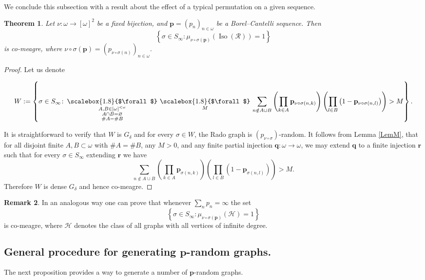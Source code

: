 \documentclass{amsart}
\newtheorem{theorem}{Theorem}[section]
\theoremstyle{plain}
\theoremstyle{definition}
\newtheorem{rem}[theorem]{Remark}
\theoremstyle{remark}
\numberwithin{equation}{section}
\DeclareMathOperator{\iso}{Iso}
\newcommand{\RR}{\mathcal{R}}
\begin{document}
We conclude this subsection with a result about the effect of a typical permutation on a given sequence.

\begin{theorem}\label{t:RezWielePerm}
    Let $\nu:\omega \rightarrow [\omega]^2$ be a fixed bijection, and $\textbf{p}=(p_n)_{n\in \omega}$ be a Borel--Cantelli sequence. Then
    \[
    \left\{\sigma\in S_\infty\colon \mu_{\nu\circ \sigma(\mathbf{p})}(\iso(\RR))=1\right\}    
    \]
 is co-meagre, where $\nu\circ\sigma(\mathbf{p})=(p_{\nu\circ\sigma(n)})_{n\in\omega}$. 
\end{theorem}

\begin{proof}
    Let us denote 

\[
W := \left\{ \sigma \in S_\infty \colon 
\mathop{\scalebox{1.8}{$\forall$}}\limits_{\substack{
A,B \in [\omega]^{<\omega} \\
A \cap B = \varnothing \\
\#A = \#B
}}\,\mathop{\scalebox{1.8}{$\forall$}}\limits_M\,
\sum\limits_{n \notin A \cup B}
\left(
  \prod\limits_{k \in A} \mathbf{p}_{\nu\circ\sigma (n,k)}
\right)
\left(
  \prod_{l \in B} \left(1 - \mathbf{p}_{\nu\circ\sigma(n,l)}\right)
\right)
> M
\right\}.
\]

    It is straightforward to verify that $W$ is $G_\delta$ and for every $\sigma\in W$, the Rado graph is $(p_{\nu\circ\sigma})$-random. It follows from Lemma \ref{LemM}, that for all disjoint finite \(A,B\subset\omega\) with \(\#A=\#B\), any \(M>0\), and any finite partial injection \(\mathbf q\colon\omega\to\omega\), we may extend $\textbf{q}$ to a finite injection $\textbf{r}$ such that for every $\sigma\in S_\infty$ extending $\textbf{r}$ we have 
    $$\sum\limits_{n \notin A\cup B} \left(\prod\limits_{k\in A} \textbf{p}_{\sigma(n,k)} \right)\left( \prod\limits_{l\in B}  (1-\textbf{p}_{\sigma(n,l)})\right)>M.$$ 
    Therefore $W$ is dense $G_\delta$ and hence co-meagre.

\end{proof}

\begin{rem}
    In an analogous way one can prove that whenever $\sum\limits_n p_n=\infty$ the set 
    \[
    \left\{ \sigma\in S_\infty \colon \mu_{\nu\circ\sigma(\mathbf{p})}(\mathcal{H})=1 \right\}
    \]
    is co-meagre, where $\mathcal{H}$ denotes the class of all graphs with all vertices of infinite degree.
\end{rem}

\subsection{General procedure for generating $\textbf{p}$-random graphs.}
The next proposition provides a way to generate a number of $\textbf{p}$-random graphs.
\end{document}
